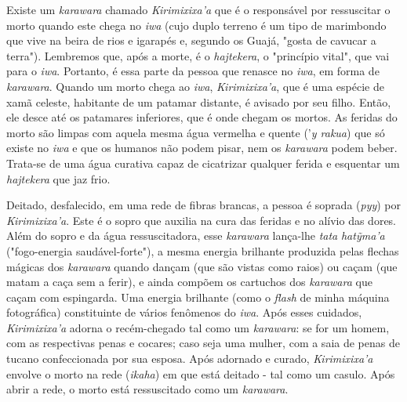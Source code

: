 Existe um \emph{karawara} chamado \emph{Kirimixixa'a} que é o
responsável por ressuscitar o morto quando este chega no \emph{iwa}
(cujo duplo terreno é um tipo de marimbondo que vive na beira de rios e
igarapés e, segundo os Guajá, "gosta de cavucar a terra"). Lembremos
que, após a morte, é o \emph{hajtekera}, o "princípio vital", que vai
para o \emph{iwa}. Portanto, é essa parte da pessoa que renasce no
\emph{iwa}, em forma de \emph{karawara}. Quando um morto chega ao
\emph{iwa}, \emph{Kirimixixa'a}, que é uma espécie de xamã celeste,
habitante de um patamar distante, é avisado por seu filho. Então, ele
desce até os patamares inferiores, que é onde chegam os mortos. As
feridas do morto são limpas com aquela mesma água vermelha e quente
('\emph{y rakua}) que só existe no \emph{iwa} e que os humanos não podem
pisar, nem os \emph{karawara} podem beber. Trata-se de uma água curativa
capaz de cicatrizar qualquer ferida e esquentar um \emph{hajtekera} que
jaz frio.

Deitado, desfalecido, em uma rede de fibras brancas, a pessoa é soprada
(\emph{pyy}) por \emph{Kirimixixa'a}. Este é o sopro que auxilia na cura
das feridas e no alívio das dores. Além do sopro e da água
ressuscitadora, esse \emph{karawara} lança-lhe \emph{tata}
\emph{hatỹma'a} ("fogo-energia saudável-forte"), a mesma energia
brilhante produzida pelas flechas mágicas dos \emph{karawara} quando
dançam (que são vistas como raios) ou caçam (que matam a caça sem a
ferir), e ainda compõem os cartuchos dos \emph{karawara} que caçam com
espingarda. Uma energia brilhante (como o \emph{flash} de minha máquina
fotográfica) constituinte de vários fenômenos do \emph{iwa}. Após esses
cuidados, \emph{Kirimixixa'a} adorna o recém-chegado tal como um
\emph{karawara}: se for um homem, com as respectivas penas e cocares;
caso seja uma mulher, com a saia de penas de tucano confeccionada por
sua esposa. Após adornado e curado, \emph{Kirimixixa'a} envolve o morto
na rede (\emph{ikaha}) em que está deitado - tal como um casulo. Após
abrir a rede, o morto está ressuscitado como um \emph{karawara}.

